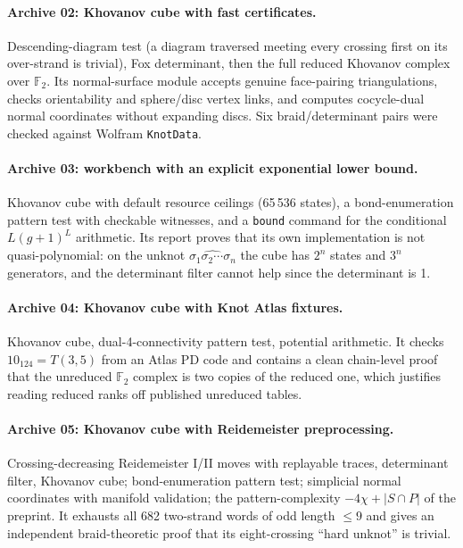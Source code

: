 \documentclass[11pt]{article}
\theoremstyle{remark}
\newcommand{\F}{\mathbb{F}_2}
\newcommand{\code}[1]{\texttt{#1}}
\begin{document}
\paragraph{Archive 02: Khovanov cube with fast certificates.}
Descending-diagram test (a diagram traversed meeting every crossing first on
its over-strand is trivial), Fox determinant, then the full reduced Khovanov
complex over $\F$. Its normal-surface module accepts genuine face-pairing
triangulations, checks orientability and sphere/disc vertex links, and
computes cocycle-dual normal coordinates without expanding discs. Six
braid/determinant pairs were checked against Wolfram \code{KnotData}.

\paragraph{Archive 03: workbench with an explicit exponential lower bound.}
Khovanov cube with default resource ceilings (65\,536 states), a
bond-enumeration pattern test with checkable witnesses, and a
\code{bound} command for the conditional $L(g+1)^L$ arithmetic. Its report
proves that its own implementation is not quasi-polynomial: on the unknot
$\widehat{\sigma_1\sigma_2\cdots\sigma_n}$ the cube has $2^n$ states and
$3^n$ generators, and the determinant filter cannot help since the
determinant is 1.

\paragraph{Archive 04: Khovanov cube with Knot Atlas fixtures.}
Khovanov cube, dual-4-connectivity pattern test, potential arithmetic. It
checks $10_{124}=T(3,5)$ from an Atlas PD code and contains a clean
chain-level proof that the unreduced $\F$ complex is two copies of the
reduced one, which justifies reading reduced ranks off published unreduced
tables.

\paragraph{Archive 05: Khovanov cube with Reidemeister preprocessing.}
Crossing-decreasing Reidemeister I/II moves with replayable traces,
determinant filter, Khovanov cube; bond-enumeration pattern test;
simplicial normal coordinates with manifold validation; the
pattern-complexity $-4\chi+|S\cap P|$ of the preprint. It exhausts all 682
two-strand words of odd length $\le9$ and gives an independent braid-theoretic
proof that its eight-crossing ``hard unknot'' is trivial.
\end{document}
